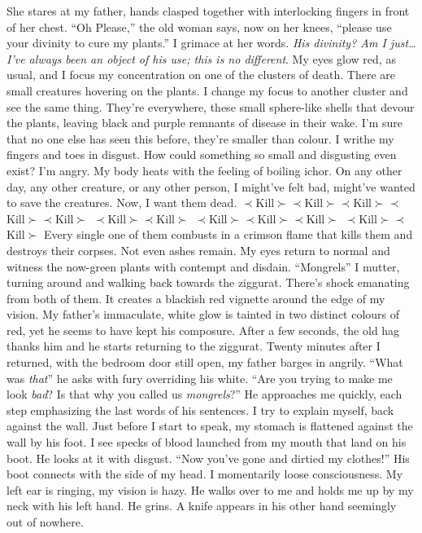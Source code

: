 \documentclass[openany, 12pt]{book}
\newcommand\tab[1][1cm]{\hspace*{#1}}
\begin{document}
\newline
\tab
She stares at my father, hands clasped together with interlocking fingers in front of her chest. ``Oh Please,'' the old woman says, now on her knees, ``please use your divinity to cure my plants.''  I grimace at her words. \textit{His divinity? Am I just… I’ve always been an object of his use; this is no different}.
\newline
\tab
My eyes glow red, as usual, and I focus my concentration on one of the clusters of death. There are small creatures hovering on the plants. I change my focus to another cluster and see the same thing. They’re everywhere, these small sphere-like shells that devour the plants, leaving black and purple remnants of disease in their wake. I’m sure that no one else has seen this before, they’re smaller than colour. I writhe my fingers and toes in disgust. How could something so small and disgusting even exist? I’m angry. My body heats with the feeling of boiling ichor. On any other day, any other creature, or any other person, I might’ve felt bad, might’ve wanted to save the creatures. Now, I want them dead.\newline
$\prec$Kill$\succ$$\prec$Kill$\succ$$\prec$Kill$\succ$$\prec$Kill$\succ$$\prec$Kill$\succ$\newline
\tab$\prec$Kill$\succ$\tab$\prec$Kill$\succ$\newline
$\prec$Kill$\succ$\tab$\prec$Kill$\succ$\tab$\prec$Kill$\succ$\newline
$\prec$Kill$\succ$\tab\tab\tab$\prec$Kill$\succ$\newline
\tab
Every single one of them combusts in a crimson flame that kills them and destroys their corpses. Not even ashes remain. My eyes return to normal and witness the now-green plants with contempt and disdain. ``Mongrels'' I mutter, turning around and walking back towards the ziggurat. There’s shock emanating from both of them. It creates a blackish red vignette around the edge of my vision. My father’s immaculate, white glow is tainted in two distinct colours of red, yet he seems to have kept his composure. After a few seconds, the old hag thanks him and he starts returning to the ziggurat.
\newline
\tab
 Twenty minutes after I returned, with the bedroom door still open, my father barges in angrily. ``What was \textit{that}\textinterrobang'' he asks with fury overriding his white. ``Are you trying to make me look \textit{bad}? Is that why you called us \textit{mongrels}?'' He approaches me quickly, each step emphasizing the last words of his sentences. I try to explain myself, back against the wall. Just before I start to speak, my stomach is flattened against the wall by his foot. I see specks of blood launched from my mouth that land on his boot. He looks at it with disgust. ``Now you’ve gone and dirtied my clothes!'' His boot connects with the side of my head. I momentarily loose consciousness. My left ear is ringing, my vision is hazy. He walks over to me and holds me up by my neck with his left hand. He grins. A knife appears in his other hand seemingly out of nowhere.
\end{document}
